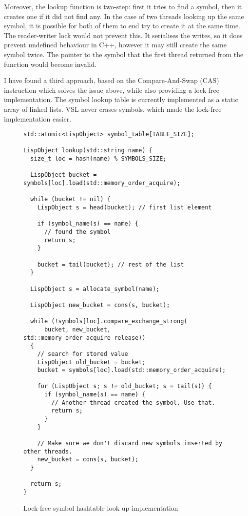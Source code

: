 Moreover, the lookup function is two-step: first it tries to find a symbol, then it creates one
if it did not find any. In the case of two threads looking up the same symbol, it is possible for
both of them to end try to create it at the same time. The reader-writer lock would not prevent this.
It serialises the writes, so it does prevent undefined behaviour in C++, however it may
still create the same symbol twice. The pointer to the symbol that the first thread returned from the function
would become invalid.

I have found a third approach, based on the Compare-And-Swap (CAS) instruction which solves the issue
above, while also providing a lock-free implementation. The symbol lookup table is currently implemented
as a static array of linked lists. VSL never erases symbols, which made the lock-free implementation easier.

\begin{figure}
\begin{verbatim}
std::atomic<LispObject> symbol_table[TABLE_SIZE];

LispObject lookup(std::string name) {
  size_t loc = hash(name) % SYMBOLS_SIZE;

  LispObject bucket = symbols[loc].load(std::memory_order_acquire);

  while (bucket != nil) {
    LispObject s = head(bucket); // first list element

    if (symbol_name(s) == name) {
      // found the symbol
      return s;
    }

    bucket = tail(bucket); // rest of the list
  }

  LispObject s = allocate_symbol(name);

  LispObject new_bucket = cons(s, bucket);

  while (!symbols[loc].compare_exchange_strong(
      bucket, new_bucket, std::memory_order_acquire_release))
  {
    // search for stored value
    LispObject old_bucket = bucket;
    bucket = symbols[loc].load(std::memory_order_acquire);

    for (LispObject s; s != old_bucket; s = tail(s)) {
      if (symbol_name(s) == name) {
        // Another thread created the symbol. Use that.
        return s;
      }
    }

    // Make sure we don't discard new symbols inserted by other threads.
    new_bucket = cons(s, bucket);
  }

  return s;
}
\end{verbatim}
\caption{Lock-free symbol hashtable look up implementation}
\label{code:lockfree}
\end{figure}

